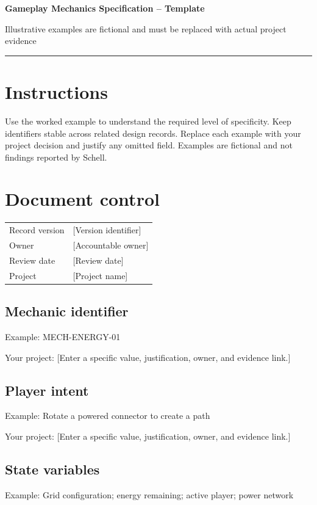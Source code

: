 \documentclass[11pt]{article}
\begin{document}
{\huge\bfseries\color{suiteblue} Gameplay Mechanics Specification -- Template}\par
\vspace{0.15in}
{\normalsize\color{suitegray} Illustrative examples are fictional and must be replaced with actual project evidence}\par
\vspace{0.15in}\hrule\vspace{0.15in}

\section{Instructions}
Use the worked example to understand the required level of specificity. Keep identifiers stable across related design records. Replace each example with your project decision and justify any omitted field. Examples are fictional and not findings reported by Schell.


\section{Document control}
\begin{tabularx}{\linewidth}{@{}lX@{}}\toprule Record version & [Version identifier]\\ Owner & [Accountable owner]\\ Review date & [Review date]\\ Project & [Project name]\\\bottomrule\end{tabularx}

\subsection{Mechanic identifier}
Example: MECH-ENERGY-01

Your project: [Enter a specific value, justification, owner, and evidence link.]


\subsection{Player intent}
Example: Rotate a powered connector to create a path

Your project: [Enter a specific value, justification, owner, and evidence link.]


\subsection{State variables}
Example: Grid configuration; energy remaining; active player; power network
\end{document}

